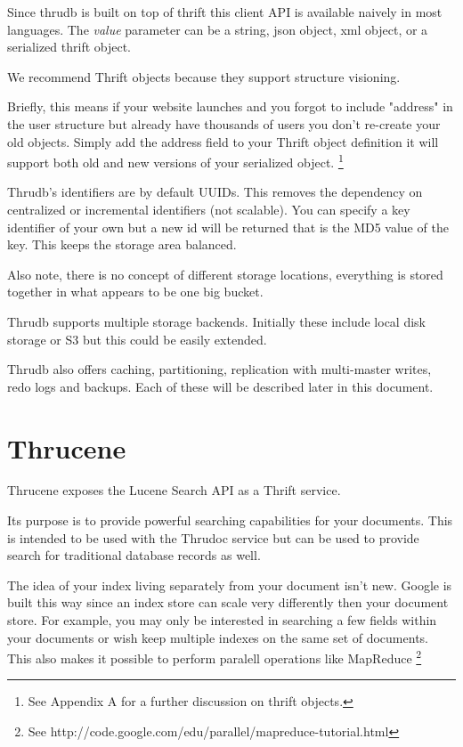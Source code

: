 \documentclass[nocopyrightspace,blockstyle]{sigplanconf}
\begin{document}
Since thrudb is built on top of thrift this client API is available naively in most languages.
The \textit{value} parameter can be a string, json object, xml object, or a serialized thrift object.

We recommend Thrift objects because they support structure visioning.

Briefly, this means if your website launches and you forgot to include "address" in the user
structure but already have thousands of users you don't re-create your old objects. Simply add the address field
to your Thrift object definition it will support both old and new versions of your serialized object.
\footnote{See Appendix A for a further discussion on thrift objects.}

Thrudb's identifiers are by default UUIDs. This removes the dependency on centralized or incremental identifiers (not scalable).
You can specify a key identifier of your own but a new id will be returned that is the MD5 value of the key.
This keeps the storage area balanced.

Also note, there is no concept of different storage locations, everything is stored together in what appears to be one big bucket.

Thrudb supports multiple storage backends.  Initially these include local disk storage or S3 but this could be easily extended.

Thrudb also offers caching, partitioning, replication with multi-master writes, redo logs and backups. Each of these
will be described later in this document.

\section{Thrucene}

Thrucene exposes the Lucene Search API as a Thrift service.

Its purpose is to provide powerful searching capabilities for your documents.
This is intended to be used with the Thrudoc service but can be used to provide search for traditional database records as well.

The idea of your index living separately from your document isn't new.
Google is built this way since an index store can scale very differently then your document store.
For example, you may only be interested in searching a few fields within your documents or
wish keep multiple indexes on the same set of documents. This also makes it possible to perform paralell operations like MapReduce
\footnote{See http://code.google.com/edu/parallel/mapreduce-tutorial.html}
\end{document}
